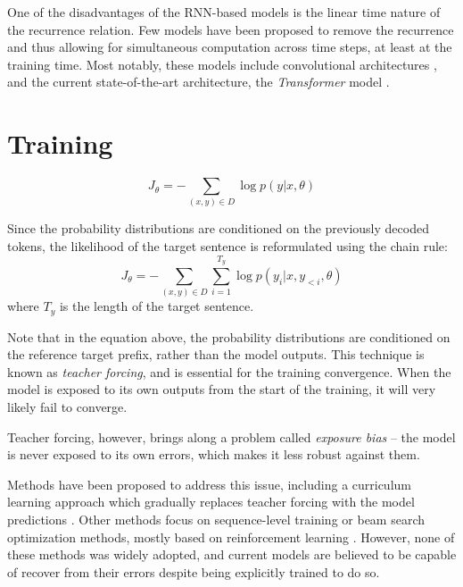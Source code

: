 One of the disadvantages of the RNN-based models is the linear time nature of
the recurrence relation. Few models have been proposed to remove the recurrence
and thus allowing for simultaneous computation across time steps, at least at
the training time. Most notably, these models include convolutional
architectures \citep{gehring2017convolutional}, and the current state-of-the-art
architecture, the \emph{Transformer} model \citep{vaswani2017attention}.


\section{Training}
\label{sec:training}



%
\begin{equation}
  J_{\theta} = - \sum_{(x, y) \in D} \log p(y | x, \theta)
\end{equation}
%

Since the probability distributions are conditioned on the previously decoded
tokens, the likelihood of the target sentence is reformulated using the chain
rule:
%
\begin{equation}
  J_{\theta} = - \sum_{(x, y) \in D} \sum_{i = 1}^{T_y} \log p(y_i | x, y_{<i}, \theta)
\end{equation}
%
where $T_y$ is the length of the target sentence.

Note that in the equation above, the probability distributions are conditioned
on the reference target prefix, rather than the model outputs. This technique
is known as \emph{teacher forcing}, and is essential for the training
convergence. When the model is exposed to its own outputs from the start of the
training, it will very likely fail to converge.

Teacher forcing, however, brings along a problem called \emph{exposure bias} --
the model is never exposed to its own errors, which makes it less robust
against them.

Methods have been proposed to address this issue, including a curriculum
learning approach which gradually replaces teacher forcing with the model
predictions \citep{scheduled}. Other methods focus on sequence-level training
or beam search optimization methods, mostly based on reinforcement learning
\citep{williams, rush-bso, mixer}. However, none of these methods was widely
adopted, and current models are believed to be capable of recover from their
errors despite being explicitly trained to do so.





